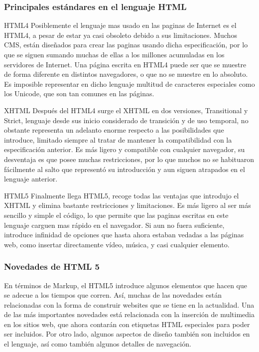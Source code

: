 \subsubsection{Principales estándares en el lenguaje HTML}

HTML4
Posiblemente el lenguaje mas usado en las paginas de Internet es el HTML4, a pesar de estar ya casi obsoleto debido a sus limitaciones.
Muchos CMS, están diseñados para crear las paginas usando dicha especificación, por lo que se siguen sumando muchas de ellas a los millones acumuladas en los servidores de Internet.
Una página escrita en HTML4 puede ser que se muestre de forma diferente en distintos navegadores, o que no se muestre en lo absoluto.
Es imposible representar en dicho lenguaje multitud de caracteres especiales como los Unicode, que son tan comunes en las páginas.

XHTML
Después del HTML4 surge el XHTML en dos versiones, Transitional y Strict, lenguaje desde sus inicio considerado de transición y de uso temporal, no obstante representa un adelanto enorme respecto a las posibilidades que introduce, limitado siempre al tratar de mantener la compatibilidad con la especificación anterior. 
Es más ligero y compatible con cualquier navegador, su desventaja es que posee muchas restricciones, por lo que muchos no se habituaron fácilmente al salto que representó su introducción y aun siguen atrapados en el lenguaje anterior.

HTML5
Finalmente llega HTML5, recoge todas las ventajas que introdujo el XHTML y elimina bastante restricciones y limitaciones.
Es más ligero al ser más sencillo y simple el código, lo que permite que las paginas escritas en este lenguaje carguen mas rápido en el navegador.
Si aun no fuera suficiente, introduce infinidad de opciones que hasta ahora estaban vedadas a las páginas web, como insertar directamente vídeo, música, y casi cualquier elemento.

\subsubsection{Novedades de HTML 5}

En términos de Markup, el HTML5 introduce algunos elementos que hacen que se adecue a los tiempos que corren. Así, muchas de las novedades están relacionadas con la forma de construir websites que se tiene en la actualidad. Una de las más importantes novedades está relacionada con la inserción de multimedia en los sitios web, que ahora contarán con etiquetas HTML especiales para poder ser incluidos. Por otro lado, algunos aspectos de diseño también son incluidos en el lenguaje, así como también algunos detalles de navegación.

